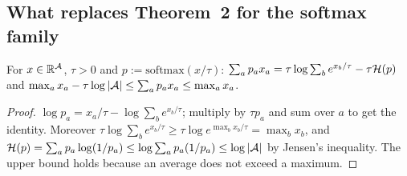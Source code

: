 \subsection{What replaces Theorem~2 for the softmax family}\label{sec:fb-softmax}

\begin{lemma}\label{lem:fb-lse}
For $x\in\mathbb{R}^{\mathcal{A}}$, $\tau>0$ and $p:=\mathrm{softmax}(x/\tau)$:
$\sum_ap_ax_a=\tau\log\sum_be^{x_b/\tau}-\tau\mathcal{H}(p)$ and $\max_ax_a-\tau\log|\mathcal{A}|\le\sum_ap_ax_a\le\max_ax_a$.
\end{lemma}
\begin{proof}
$\log p_a=x_a/\tau-\log\sum_be^{x_b/\tau}$; multiply by $\tau p_a$ and sum over $a$ to get the identity.
Moreover $\tau\log\sum_be^{x_b/\tau}\ge\tau\log e^{\max_bx_b/\tau}=\max_bx_b$, and $\mathcal{H}(p)=\sum_ap_a\log(1/p_a)\le\log\sum_ap_a(1/p_a)\le\log|\mathcal{A}|$ by Jensen's inequality.
The upper bound holds because an average does not exceed a maximum.
\end{proof}

